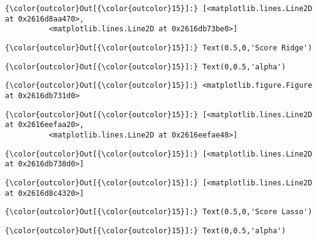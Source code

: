 \documentclass[11pt]{article}
\begin{document}
\begin{Verbatim}[commandchars=\\\{\}]
{\color{outcolor}Out[{\color{outcolor}15}]:} [<matplotlib.lines.Line2D at 0x2616d8aa470>,
          <matplotlib.lines.Line2D at 0x2616db73be0>]
\end{Verbatim}
            
\begin{Verbatim}[commandchars=\\\{\}]
{\color{outcolor}Out[{\color{outcolor}15}]:} Text(0.5,0,'Score Ridge')
\end{Verbatim}
            
\begin{Verbatim}[commandchars=\\\{\}]
{\color{outcolor}Out[{\color{outcolor}15}]:} Text(0,0.5,'alpha')
\end{Verbatim}
            
\begin{Verbatim}[commandchars=\\\{\}]
{\color{outcolor}Out[{\color{outcolor}15}]:} <matplotlib.figure.Figure at 0x2616db731d0>
\end{Verbatim}
            
\begin{Verbatim}[commandchars=\\\{\}]
{\color{outcolor}Out[{\color{outcolor}15}]:} [<matplotlib.lines.Line2D at 0x2616eefaa20>,
          <matplotlib.lines.Line2D at 0x2616eefae48>]
\end{Verbatim}
            
\begin{Verbatim}[commandchars=\\\{\}]
{\color{outcolor}Out[{\color{outcolor}15}]:} [<matplotlib.lines.Line2D at 0x2616db738d0>]
\end{Verbatim}
            
\begin{Verbatim}[commandchars=\\\{\}]
{\color{outcolor}Out[{\color{outcolor}15}]:} [<matplotlib.lines.Line2D at 0x2616d8c4320>]
\end{Verbatim}
            
\begin{Verbatim}[commandchars=\\\{\}]
{\color{outcolor}Out[{\color{outcolor}15}]:} Text(0.5,0,'Score Lasso')
\end{Verbatim}
            
\begin{Verbatim}[commandchars=\\\{\}]
{\color{outcolor}Out[{\color{outcolor}15}]:} Text(0,0.5,'alpha')
\end{Verbatim}
            
\end{document}
